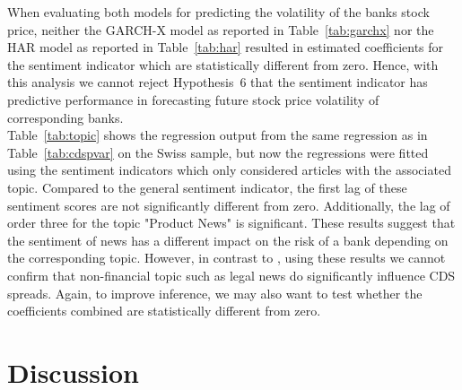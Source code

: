 

When evaluating both models for predicting the volatility of the banks stock price, neither the GARCH-X model as reported in \mbox{Table~\ref{tab:garchx}} nor the HAR model as reported in \mbox{Table~\ref{tab:har}} resulted in estimated coefficients for the sentiment indicator which are statistically different from zero. Hence, with this analysis we cannot reject \mbox{Hypothesis~6} that the sentiment indicator has predictive performance in forecasting future stock price volatility of corresponding banks. \\





\mbox{Table~\ref{tab:topic}} shows the regression output from the same regression as in \mbox{Table~\ref{tab:cdspvar}} on the Swiss sample, but now the regressions were fitted using the sentiment indicators which only considered articles with the associated topic. Compared to the general sentiment indicator, the first lag of these sentiment scores are not significantly different from zero. Additionally, the lag of order three for the topic "Product News" is significant. These results suggest that the sentiment of news has a different impact on the risk of a bank depending on the corresponding topic. However, in contrast to \cite{roeder2020}, using these results we cannot confirm that non-financial topic such as legal news do significantly influence CDS spreads. Again, to improve inference, we may also want to test whether the coefficients combined are statistically different from zero.




%
%
%

\newpage
\section{Discussion} \label{sec:discussion-sec5}

